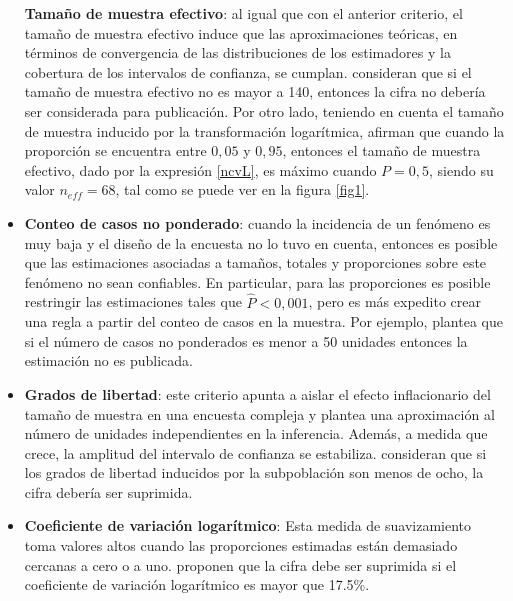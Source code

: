 \documentclass[
  10pt,
  spanish,
]{book}
\begin{document}
\begin{itemize}
  \textbf{Tamaño de muestra efectivo}: al igual que con el anterior criterio, el tamaño de muestra efectivo induce que las aproximaciones teóricas, en términos de convergencia de las distribuciones de los estimadores y la cobertura de los intervalos de confianza, se cumplan. \citet{Hornik_Maklan_Cadell_Prado_Barmada_Jacobsohn_Orwin_Sridharan_Zador_Southwell_etal} consideran que si el tamaño de muestra efectivo no es mayor a 140, entonces la cifra no debería ser considerada para publicación. Por otro lado, teniendo en cuenta el tamaño de muestra inducido por la transformación logarítmica, \citet{Barnett_Walker_Chromy_Davis_Emrich_Odom_Packer_2003} afirman que cuando la proporción se encuentra entre \(0,05\) y \(0,95\), entonces el tamaño de muestra efectivo, dado por la expresión \eqref{ncvL}, es máximo cuando \(P = 0,5\), siendo su valor \(n_{eff} = 68\), tal como se puede ver en la figura \ref{fig1}.
\item
  \textbf{Conteo de casos no ponderado}: cuando la incidencia de un fenómeno es muy baja y el diseño de la encuesta no lo tuvo en cuenta, entonces es posible que las estimaciones asociadas a tamaños, totales y proporciones sobre este fenómeno no sean confiables. En particular, para las proporciones es posible restringir las estimaciones tales que \(\hat P <0,001\), pero es más expedito crear una regla a partir del conteo de casos en la muestra. Por ejemplo, \citet{AmericanCommunitySurvey} plantea que si el número de casos no ponderados es menor a 50 unidades entonces la estimación no es publicada.
\item
  \textbf{Grados de libertad}: este criterio apunta a aislar el efecto inflacionario del tamaño de muestra en una encuesta compleja y plantea una aproximación al número de unidades independientes en la inferencia. Además, a medida que crece, la amplitud del intervalo de confianza se estabiliza. \citet{Parker_Talih_Malec_2017} consideran que si los grados de libertad inducidos por la subpoblación son menos de ocho, la cifra debería ser suprimida.
\item
  \textbf{Coeficiente de variación logarítmico}: Esta medida de suavizamiento toma valores altos cuando las proporciones estimadas están demasiado cercanas a cero o a uno. \citet{Barnett_Walker_Chromy_Davis_Emrich_Odom_Packer_2003} proponen que la cifra debe ser suprimida si el coeficiente de variación logarítmico es mayor que 17.5\%.
\end{itemize}
\end{document}
